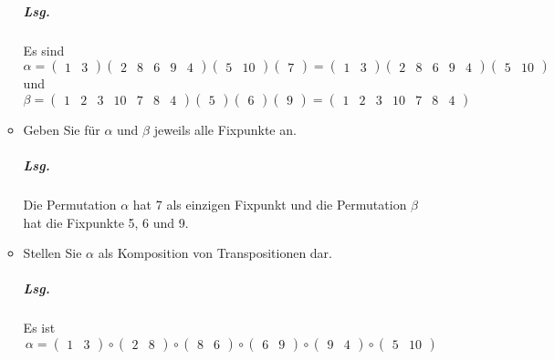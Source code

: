 \documentclass{scrreprt}
\begin{document}
\begin{enumerate}[(a)]
\begin{itemize}
    \subparagraph{Lsg.} Es sind
    \[
      \alpha = \begin{pmatrix} 1 & 3 \end{pmatrix}
      \begin{pmatrix} 2 & 8 & 6 & 9 & 4 \end{pmatrix}
      \begin{pmatrix} 5 & 10 \end{pmatrix}
      \begin{pmatrix} 7 \end{pmatrix}
      = \begin{pmatrix} 1 & 3 \end{pmatrix}
      \begin{pmatrix} 2 & 8 & 6 & 9 & 4 \end{pmatrix}
      \begin{pmatrix} 5 & 10 \end{pmatrix}
    \]
    und
    \[
      \beta = \begin{pmatrix} 1 & 2 & 3 & 10 & 7 & 8 & 4 \end{pmatrix}
      \begin{pmatrix} 5 \end{pmatrix}
      \begin{pmatrix} 6 \end{pmatrix}
      \begin{pmatrix} 9 \end{pmatrix}
      = \begin{pmatrix} 1 & 2 & 3 & 10 & 7 & 8 & 4 \end{pmatrix}
    \]

  \newpage
  \item Geben Sie für $\alpha$ und $\beta$ jeweils alle Fixpunkte an.

    \subparagraph{Lsg.} Die Permutation $\alpha$ hat 7 als einzigen Fixpunkt und
    die Permutation $\beta$ hat die Fixpunkte 5, 6 und 9.

  \item Stellen Sie $\alpha$ als Komposition von Transpositionen dar.

    \subparagraph{Lsg.} Es ist
    \[
      \alpha = \begin{pmatrix} 1 & 3 \end{pmatrix} \circ
      \begin{pmatrix} 2 & 8 \end{pmatrix} \circ
      \begin{pmatrix} 8 & 6 \end{pmatrix} \circ
      \begin{pmatrix} 6 & 9 \end{pmatrix} \circ
      \begin{pmatrix} 9 & 4 \end{pmatrix} \circ
      \begin{pmatrix} 5 & 10 \end{pmatrix}
    \]
  \end{itemize}
\end{enumerate}
\end{document}
